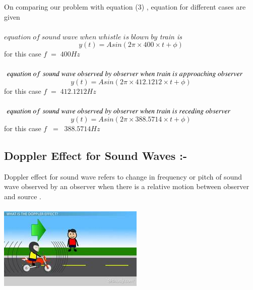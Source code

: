 \documentclass[journal,12pt,twocolumn]{IEEEtran}
\theoremstyle{remark}
\begin{document}
On comparing our problem with equation (3) , equation for different cases are given\\\\
$equation \;of\; sound\; wave\; when\; whistle\; is\; blown\; by$
\textit{train is}
$$y(t) = Asin( 2 \pi \times400\times t + \phi ) $$ 
\;\;\;\;\;\;\;\;\;\;\;\;\;\;\;\;\;\;\;\;for this case $f\;=\;400Hz$\\\\
$equation \;of\; sound\; wave\; observed\; by\; observer\;when\\ \;train\;is\; approaching\; observer\;$
$$y(t) = Asin( 2 \pi \times412.1212\times t + \phi ) $$ 
\;\;\;\;\;\;\;\;\;\;\;\;\;\;\;\;\;\;\;\;for this case $f\;=\;412.1212Hz$\\\\
$equation \;of\; sound\; wave\; observed\; by\; observer\;when\\ \;train\;is\; receding\; observer\;$
$$y(t) = Asin( 2 \pi \times388.5714\times t + \phi ) $$ 
\;\;\;\;\;\;\;\;\;\;\;\;\;\;\;\;\;\;\;\;for this case $f \;\;= \;\;388.5714Hz$\\
\subsection*{\textbf{Doppler Effect for Sound Waves :-}}
Doppler effect for sound wave refers to change in frequency or pitch of sound wave observed by an observer when there is a relative motion between observer and source .\\\\

    \includegraphics[width=0.89\linewidth]{figs/doppler.jpg}\\\\
\end{document}
